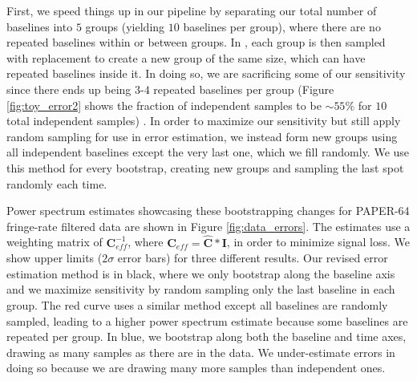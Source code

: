 \documentclass[preprint2,numberedappendix,tighten]{aastex6}  %
\begin{document}
First, we speed things up in our pipeline by separating our total number of baselines into $5$ groups (yielding $10$ baselines per group), where there are no repeated baselines within or between groups. In \citet{ali_et_al2015}, each group is then sampled with replacement to create a new group of the same size, which can have repeated baselines inside it. In doing so, we are sacrificing some of our sensitivity since there ends up being $3$-$4$ repeated baselines per group (Figure \ref{fig:toy_error2} shows the fraction of independent samples to be $\sim55\%$ for $10$ total independent samples) . In order to maximize our sensitivity but still apply random sampling for use in error estimation, we instead form new groups using all independent baselines except the very last one, which we fill randomly. We use this method for every bootstrap, creating new groups and sampling the last spot randomly each time.

Power spectrum estimates showcasing these bootstrapping changes for PAPER-64 fringe-rate filtered data are shown in Figure \ref{fig:data_errors}. The estimates use a weighting matrix of $\textbf{C}_{eff}^{-1}$, where $\textbf{C}_{eff} = \hat{\textbf{C}}*\textbf{I}$, in order to minimize signal loss. We show upper limits ($2\sigma$ error bars) for three different results. Our revised error estimation method is in black, where we only bootstrap along the baseline axis and we maximize sensitivity by random sampling only the last baseline in each group. The red curve uses a similar method except all baselines are randomly sampled, leading to a higher power spectrum estimate because some baselines are repeated per group. In blue, we bootstrap along both the baseline and time axes, drawing as many samples as there are in the data. We under-estimate errors in doing so because we are drawing many more samples than independent ones.
\end{document}

